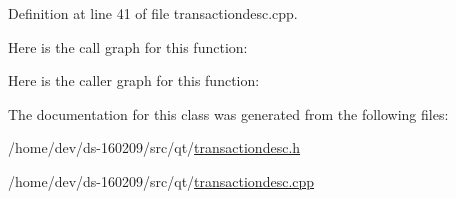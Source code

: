 Definition at line 41 of file transactiondesc.\+cpp.



Here is the call graph for this function\+:




Here is the caller graph for this function\+:




The documentation for this class was generated from the following files\+:\begin{DoxyCompactItemize}
\item 
/home/dev/ds-\/160209/src/qt/\hyperlink{transactiondesc_8h}{transactiondesc.\+h}\item 
/home/dev/ds-\/160209/src/qt/\hyperlink{transactiondesc_8cpp}{transactiondesc.\+cpp}\end{DoxyCompactItemize}
